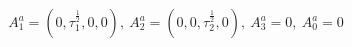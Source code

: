 \begin{equation}
\label{1}A_1^a=(0,\tau _1^{\frac 12},0,0),\ A_2^a=(0,0,\tau _2^{\frac
12},0),\ A_3^a=0,\ A_0^a=0 
\end{equation}

